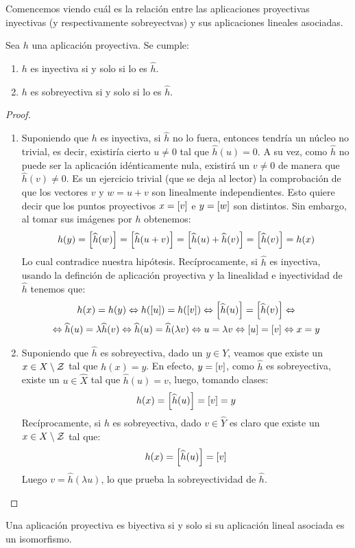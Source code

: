 Comencemos viendo cuál es la relación entre las aplicaciones proyectivas inyectivas (y respectivamente sobreyectvas) y sus aplicaciones lineales asociadas.
\begin{lem}
	\label{C4_lem_inyectividadSobreyectividad}
	Sea $h$ una aplicación proyectiva. Se cumple:
	\begin{enumerate}
		\item $h$ es inyectiva si y solo si lo es $\widehat{h}$.
		\item $h$ es sobreyectiva si y solo si lo es $\widehat{h}$.
	\end{enumerate}
\end{lem}
\begin{proof}
	\begin{enumerate}
		\item Suponiendo que $h$ es inyectiva, si $\widehat{h}$ no lo fuera, entonces tendría un núcleo no trivial, es decir, existiría cierto $u\not=0$ tal que $\widehat{h}(u)=0$. A su vez, como $\widehat{h}$ no puede ser la aplicación idénticamente nula, existirá un $v\not=0$ de manera que $\widehat{h}(v)\not=0$. Es un ejercicio trivial (que se deja al lector) la comprobación de que los vectores $v$ y $w=u+v$ son linealmente independientes. Esto quiere decir que los puntos proyectivos $x=\left [ v \right ]$ e $y=\left [ w \right ]$ son distintos. Sin embargo, al tomar sus imágenes por $h$ obtenemos:
		\[h(y)=\left [ \widehat{h}(w) \right ]=\left [ \widehat{h}(u+v) \right ]=\left [ \widehat{h}(u)+\widehat{h}(v) \right ]=\left [ \widehat{h}(v) \right ]=h(x)\]
		Lo cual contradice nuestra hipótesis. Recíprocamente, si $\widehat{h}$ es inyectiva, usando la definción de aplicación proyectiva y la linealidad e inyectividad de $\widehat{h}$ tenemos que:
		\begin{multline}
			h(x)=h(y)\Leftrightarrow h(\left [ u \right ])=h(\left [ v \right ])\Leftrightarrow\left [ \widehat{h}(u) \right ]=\left [ \widehat{h}(v) \right ]\Leftrightarrow\\\Leftrightarrow\widehat{h}(u)=\lambda \widehat{h}(v)\Leftrightarrow\widehat{h}(u)=\widehat{h}(\lambda v)\Leftrightarrow u = \lambda v\Leftrightarrow\left [ u \right ]=\left [ v \right ]\Leftrightarrow x=y
		\end{multline}
		\item Suponiendo que $\widehat{h}$ es sobreyectiva, dado un $y\in Y$, veamos que existe un $x\in X\setminus\mathcal{Z}$ tal que $h(x)=y$. En efecto, $y=\left [ v \right ]$, como $\widehat{h}$ es sobreyectiva, existe un $u\in \widehat{X}$ tal que $\widehat{h}(u)=v$, luego, tomando clases:
		\[h(x)=\left [ \widehat{h}(u) \right ]=\left [ v \right ]=y\]
		Recíprocamente, si $h$ es sobreyectiva, dado $v\in\widehat{Y}$ es claro que existe un $x\in X\setminus\mathcal{Z}$ tal que: 
		\[h(x)=\left [ \widehat{h}(u) \right ]=\left [ v \right ]\]
		Luego $v=\widehat{h}(\lambda u)$, lo que prueba la sobreyectividad de $\widehat{h}$.
	\end{enumerate}
\end{proof}
\begin{cor}[Biyectividad]
	Una aplicación proyectiva es biyectiva si y solo si su aplicación lineal asociada es un isomorfismo.
\end{cor}

